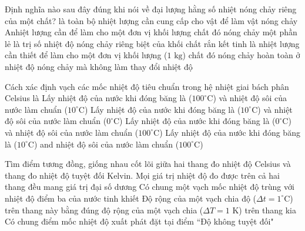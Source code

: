\begin{ex}	Định nghĩa nào sau đây đúng khi nói về đại lượng hằng số nhiệt nóng chảy riêng của một chất?
	\choice
	{là toàn bộ nhiệt lượng cần cung cấp cho vật để làm vật nóng chảy}
	{Anhiệt lượng cần để làm cho một đơn vị khối lượng chất đó nóng chảy một phần lẻ}
	{là trị số nhiệt độ nóng chảy riêng biệt của khối chất rắn kết tinh}
	{\True là nhiệt lượng cần thiết để làm cho một đơn vị khối lượng ($1\text{ kg}$) chất đó nóng chảy hoàn toàn ở nhiệt độ nóng chảy mà không làm thay đổi nhiệt độ}
\end{ex}

\begin{ex}	Cách xác định vạch các mốc nhiệt độ tiêu chuẩn trong hệ nhiệt giai bách phân Celsius là
	\choice
	{Lấy nhiệt độ của nước khi đóng băng là ($100^\circ\text{C}$) và nhiệt độ sôi của nước làm chuẩn ($10^\circ\text{C}$)}
	{Lấy nhiệt độ của nước khi đóng băng là ($10^\circ\text{C}$) và nhiệt độ sôi của nước làm chuẩn ($0^\circ\text{C}$)}
	{\True Lấy nhiệt độ của nước khi đóng băng là ($0^\circ\text{C}$) và nhiệt độ sôi của nước làm chuẩn ($100^\circ\text{C}$)}
	{Lấy nhiệt độ của nước khi đóng băng là ($10^\circ\text{C}$) and nhiệt độ sôi của nước làm chuẩn ($100^\circ\text{C}$)}
\end{ex}

\begin{ex}	Tìm điểm tương đồng, giống nhau cốt lõi giữa hai thang đo nhiệt độ Celsius và thang đo nhiệt độ tuyệt đối Kelvin.
	\choice
	{Mọi giá trị nhiệt độ đo được trên cả hai thang đều mang giá trị đại số dương}
	{Có chung một vạch mốc nhiệt độ trùng với nhiệt độ điểm ba của nước tinh khiết}
	{\True Độ rộng của một vạch chia độ ($\Delta t = 1^\circ\text{C}$) trên thang này bằng đúng độ rộng của một vạch chia ($\Delta T = 1\text{ K}$) trên thang kia}
	{Có chung điểm mốc nhiệt độ xuất phát đặt tại điểm “Độ không tuyệt đối"}
\end{ex}

